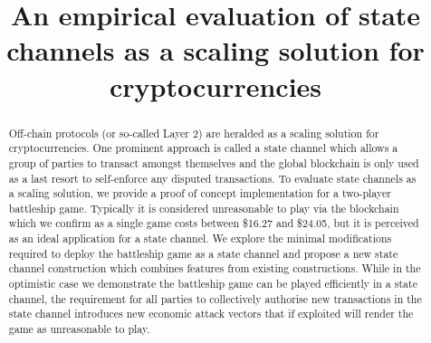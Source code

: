 \documentclass{llncs}
\begin{document}
	\title{An empirical evaluation of state channels as a scaling solution for cryptocurrencies}
	
%	
%	

	\maketitle
	\begin{abstract}
		 Off-chain protocols (or so-called Layer 2) are heralded as a scaling solution for cryptocurrencies.
		 One prominent approach is called a state channel which allows a group of parties to transact amongst themselves and the global blockchain is only used as a last resort to self-enforce any disputed transactions. 
		 To evaluate state channels as a scaling solution, we provide a proof of concept implementation for a two-player battleship game.
		 Typically it is considered unreasonable to play via the blockchain which we confirm as a single game costs between \$16.27 and \$24.05, but it is perceived as an ideal application for a state channel. 
		 We explore the minimal modifications required to deploy the battleship game as a state channel and propose a new state channel construction which combines features from existing constructions. 
		 While in the optimistic case we demonstrate the battleship game can be played efficiently in a state channel, the requirement for all parties to collectively authorise new transactions in the state channel introduces new economic attack vectors that if exploited will render the game as unreasonable to play. 
	\end{abstract} 
\end{document}
